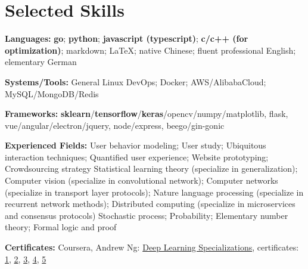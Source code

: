 \section{\textbf{Selected Skills}}
\resumeSubHeadingListStart
\item{
  \textbf{Languages:}{ 
    \textbf{go}; \textbf{python}; 
    \textbf{javascript (typescript)}; 
    \textbf{c/c++ (for optimization)}; 
    markdown; \LaTeX; 
    native Chinese; fluent professional English; elementary German
  }
}
\item{
 \textbf{Systems/Tools:}{ General Linux DevOps; Docker; AWS/AlibabaCloud; MySQL/MongoDB/Redis}
}
\item{
 \textbf{Frameworks:}{ \textbf{sklearn}/\textbf{tensorflow}/\textbf{keras}/opencv/numpy/matplotlib, flask, vue/angular/electron/jquery, node/express, beego/gin-gonic}
}
\item{
  \textbf{Experienced Fields:}{ 
    \resumeItemListStart
        { 
          User behavior modeling;
          User study; 
          Ubiquitous interaction techniques; 
          Quantified user experience; 
          Website prototyping; 
          Crowdsourcing strategy
        }
        { 
          Statistical learning theory (specialize in generalization); 
          Computer vision (specialize in convolutional network); 
          Computer networks (specialize in transport layer protocols); 
          Nature language processing (specialize in recurrent network methods); 
          Distributed computing (specialize in microservices and consensus protocols)
        }
        { 
          Stochastic process; 
          Probability; 
          Elementary number theory; 
          Formal logic and proof
        }
   \resumeItemListEnd
  }
}
\item{
  \textbf{Certificates:}{
    Coursera, Andrew Ng: \href{https://www.coursera.org/account/accomplishments/specialization/QGH8ZVJ6J2L2}{Deep Learning Specializations}, certificates:
    \href{https://www.coursera.org/account/accomplishments/verify/YH4NT7HHN263}{1}, 
    \href{https://www.coursera.org/account/accomplishments/verify/QGH3GNGF6BM4}{2}, 
    \href{https://www.coursera.org/account/accomplishments/verify/6VU45R2SZEF6}{3},
    \href{https://www.coursera.org/account/accomplishments/verify/LF3K9BQQDLVL}{4},
    \href{https://www.coursera.org/account/accomplishments/verify/JQFLW2DPYAGW}{5}
  }
}
\resumeSubHeadingListEnd